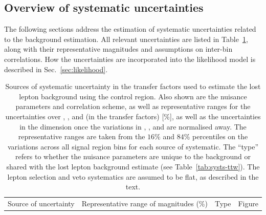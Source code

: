 \subsection{Overview of systematic uncertainties}
\label{sec:systematics-zinv}

The following sections address the estimation of systematic
uncertainties related to the \znunuj background estimation. All
relevant uncertainties are listed in Table~\ref{tab:systs-zinv}, along
with their representative magnitudes and assumptions on inter-bin
correlations. How the uncertainties are incorporated into the
likelihood model is described in Sec.~\ref{sec:likelihood}.

\begin{table}[h!]
  \caption{Sources of systematic uncertainty in the transfer factors
    used to estimate the lost lepton background using the \mj control
    region. Also shown are the nuisance parameters and correlation
    scheme, as well as representative ranges for the uncertainties
    over \njet, \nb, and \scalht (\ie in the transfer factors) [\%],
    as well as the uncertainties in the \mht dimension once the
    variations in \njet, \nb, and \scalht are normalised away. The
    representative ranges are taken from the $16\%$ and $84\%$
    percentiles on the variations across all signal region bins for
    each source of systematic. The ``type'' refers to whether the
    nuisance parameters are unique to the \znunuj background  
    or shared with the lost lepton background estimate
    (see Table~\ref{tab:systs-ttw}). The lepton selection and veto
    systematics are assumed to be flat, as described in the text. 
  }
  \label{tab:systs-zinv}
  \centering
  \fontsize{8}{9.6}\selectfont
  \newcommand{\cat}{\njet, \scalht, \nb, \mht}
  \begin{tabular}{ llllc }
    \hline
    Source of uncertainty               & \multicolumn{2}{c}{Representative range of magnitudes (\%)} & Type & Figure \\


\end{tabular}
\end{table}
